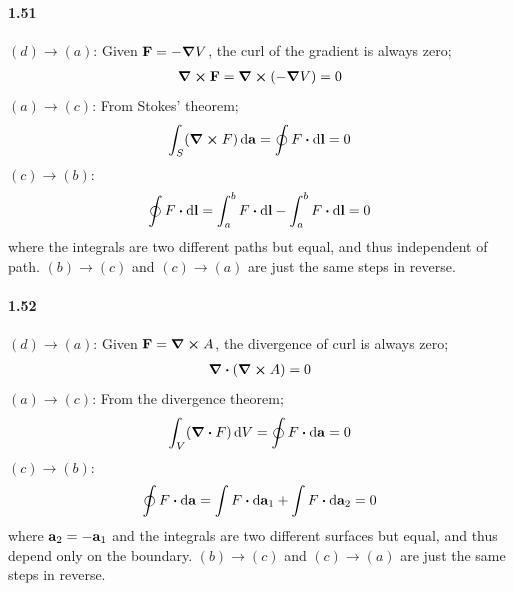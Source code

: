 \documentclass[../main.tex]{subfiles}
\begin{document}
\paragraph{1.51}
$(d) \to (a)$: Given $\vb{F} = -\grad{V}$, the curl of the gradient is always zero;
\begin{align*}
    \curl \vb{F} = \curl (-\grad{V}) = 0
\end{align*}
$(a) \to (c)$: From Stokes' theorem;
\begin{align*}
    \int_S (\curl F) \dd{\vb{a}} = \oint F \vdot \dd{\vb{l}} = 0
\end{align*}
$(c) \to (b)$: 
\begin{align*}
    \oint F \vdot \dd{\vb{l}} = \int_a^b F \vdot \dd{\vb{l}} - \int_a^b F \vdot \dd{\vb{l}} = 0
\end{align*}
where the integrals are two different paths but equal, and thus independent of path.
$(b) \to (c)$ and $(c) \to (a)$ are just the same steps in reverse.

\paragraph{1.52}
$(d) \to (a)$: Given $\vb{F} = \curl A$, the divergence of curl is always zero;
\begin{align*}
    \div (\curl A) = 0
\end{align*}
$(a) \to (c)$: From the divergence theorem;
\begin{align*}
    \int_V (\div F) \dd{V} = \oint F \vdot \dd{\vb{a}} = 0
\end{align*}
$(c) \to (b)$:
\begin{align*}
    \oint F \vdot \dd{\vb{a}} = \int F \vdot \dd{\vb{a}_1} + \int F \vdot \dd{\vb{a}_2} = 0
\end{align*}
where $\vb{a}_2 = -\vb{a}_1$ and the integrals are two different surfaces but equal, and thus depend
only on the boundary.
$(b) \to (c)$ and $(c) \to (a)$ are just the same steps in reverse.
\end{document}
